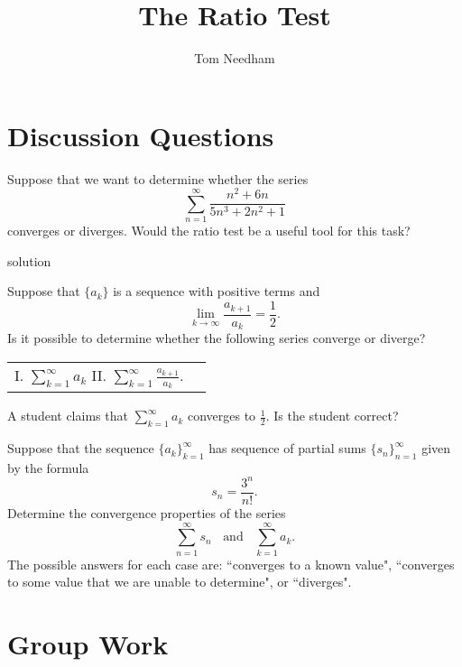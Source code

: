 \documentclass[handout]{ximera}
\author{Tom Needham}
\title[]{The Ratio Test}
\begin{document}
\begin{abstract}
\end{abstract}
\maketitle

\vspace{-0.5in}

\section{Discussion Questions}

\begin{problem}
Suppose that we want to determine whether the series
$$
\sum_{n=1}^\infty \frac{n^2+6n}{5n^3 + 2n^2 + 1}
$$
converges or diverges. Would the ratio test be a useful tool for this task?
\end{problem}

\begin{freeResponse}
solution
\end{freeResponse}

\begin{problem}
Suppose that $\{a_k\}$ is a sequence with positive terms and 
$$
\lim_{k \rightarrow \infty} \frac{a_{k+1}}{a_k} = \frac{1}{2}.
$$
Is it possible to determine whether the following series converge or diverge?
\begin{center}
\begin{tabular}{ll}
I. $\sum_{k=1}^\infty a_k$ \hspace{1in} II. $\sum_{k=1}^\infty \frac{a_{k+1}}{a_k}$.
\end{tabular}
\end{center}
A student claims that $\sum_{k=1}^\infty a_k$ converges to $\frac{1}{2}$. Is the student correct?
\end{problem}

\begin{problem}
Suppose that the sequence $\{a_k\}_{k=1}^\infty$ has sequence of partial sums $\{s_n\}_{n=1}^\infty$ given by the formula
$$
s_n = \frac{3^n}{n!}.
$$
Determine the convergence properties of the series 
$$
\sum_{n=1}^\infty s_n \;\; \mbox{ and } \;\; \sum_{k=1}^\infty a_k. 
$$
The possible answers for each case are: ``converges to a known value", ``converges to some value that we are unable to determine", or ``diverges".
\end{problem}

\section{Group Work}
\end{document}
